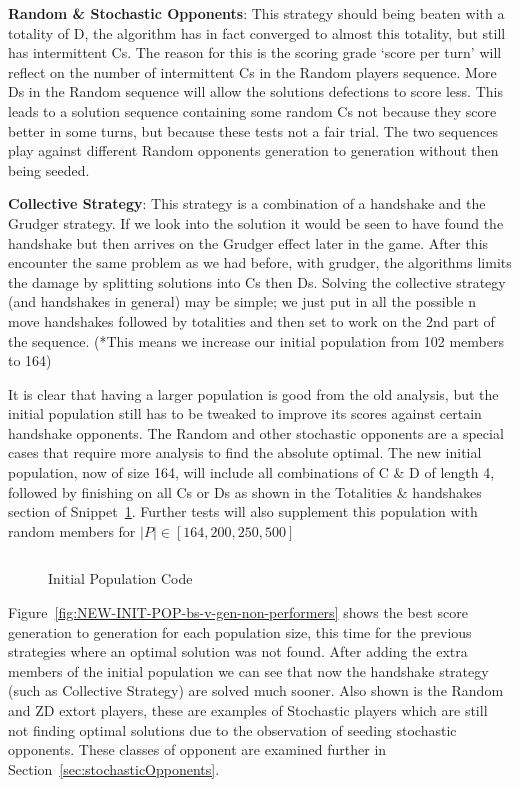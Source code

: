 \textbf{Random \& Stochastic Opponents}: This strategy should being beaten with a totality of D, the algorithm has in fact converged to almost this totality, but still has intermittent Cs.
The reason for this is the scoring grade `score per turn' will reflect on the number of intermittent Cs in the Random players sequence.
More Ds in the Random sequence will allow the solutions defections to score less.
This leads to a solution sequence containing some random Cs not because they score better in some turns, but because these tests not a fair trial.
The two sequences play against different Random opponents generation to generation without then being seeded.

\textbf{Collective Strategy}: This strategy is a combination of a handshake and the Grudger strategy.
If we look into the solution it would be seen to have found the handshake but then arrives on the Grudger effect later in the game.
After this encounter the same problem as we had before, with grudger, the algorithms limits the damage by splitting solutions into Cs then Ds.
Solving the collective strategy (and handshakes in general) may be simple;
we just put in all the possible n move handshakes followed by totalities and then set to work on the 2nd part of the sequence.
(*This means we increase our initial population from 102 members to 164)

It is clear that having a larger population is good from the old analysis, but the initial population still has to be tweaked to improve its scores against certain handshake opponents.
The Random and other stochastic opponents are a special cases that require more analysis to find the absolute optimal.
The new initial population, now of size 164, will include all combinations of C \& D of length 4, followed by finishing on all Cs or Ds as shown in the Totalities \& handshakes section of Snippet~\ref{code:initialPopulationCode}.
Further tests will also supplement this population with random members for \(|P| \in [164,200,250,500]\)

\begin{figure}[h]
    \inputminted{python}{code_snippets/initialPopulationCode.py}
    \caption{Initial Population Code}\label{code:initialPopulationCode}
\end{figure}

Figure~\ref{fig:NEW-INIT-POP-bs-v-gen-non-performers} shows the best score generation to generation for each population size, this time for the previous strategies where an optimal solution was not found.
After adding the extra members of the initial population we can see that now the handshake strategy (such as Collective Strategy) are solved much sooner.
Also shown is the Random and ZD extort players, these are examples of Stochastic players which are still not finding optimal solutions due to the observation of seeding stochastic opponents.
These classes of opponent are examined further in Section~\ref{sec:stochasticOpponents}.

